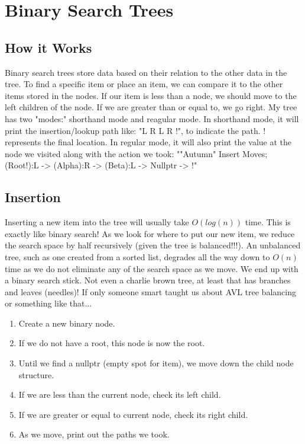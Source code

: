 \documentclass[letterpaper, 10pt]{article}
\begin{document}
\section{Binary Search Trees}
\subsection{How it Works}
Binary search trees store data based on their relation to the other data in the tree. To find a specific item or place an item, we can compare it to the other items stored in the nodes. If our item is less than a node, we should move to the left children of the node. If we are greater than or equal to, we go right. My tree has two "modes:" shorthand mode and reagular mode. In shorthand mode, it will print the insertion/lookup path like: "L R L R !", to indicate the path. ! represents the final location. In regular mode, it will also print the value at the node we visited along with the action we took: ""Autumn" Insert Moves; (Root!):L -\textgreater{} (Alpha):R -\textgreater{} (Beta):L -\textgreater{} Nullptr -\textgreater{} !" \\


\subsection{Insertion}
Inserting a new item into the tree will usually take $O(log(n))$ time. This is exactly like binary search! As we look for where to put our new item, we reduce the search space by half recursively (given the tree is balanced!!!). An unbalanced tree, such as one created from a sorted list, degrades all the way down to $O(n)$ time as we do not eliminate any of the search space as we move. We end up with a binary search stick. Not even a charlie brown tree, at least that has branches and leaves (needles)! If only someone smart taught us about AVL tree balancing or something like that...
\begin{enumerate}
    \item Create a new binary node.
    \item If we do not have a root, this node is now the root.
    \item Until we find a nullptr (empty spot for item), we move down the child node structure.
    \item If we are less than the current node, check its left child.
    \item If we are greater or equal to current node, check its right child.
    \item As we move, print out the paths we took.
\end{enumerate}

\end{document}
